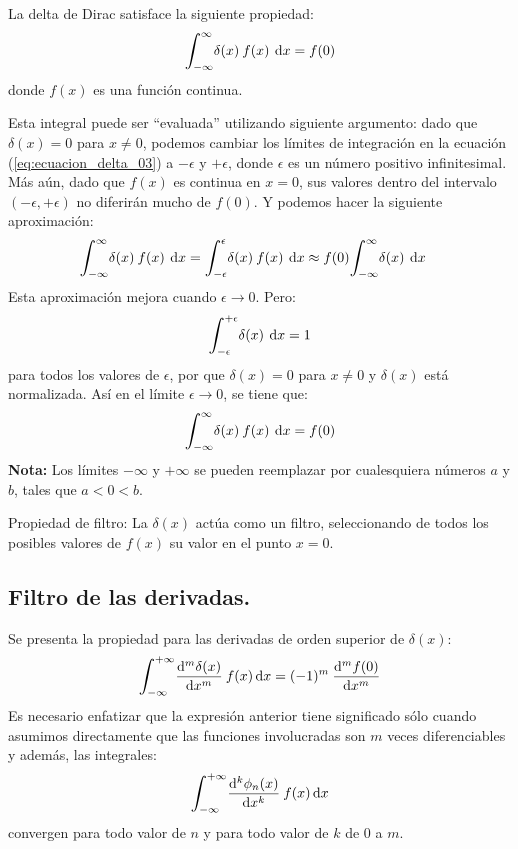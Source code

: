 \documentclass[12pt]{article}
\def\scaleint#1{\vcenter{\hbox{\scaleto[3ex]{\displaystyle\int}{#1}}}}
\def\bs{\mkern-12mu}
\numberwithin{equation}{section}
\begin{document}
La delta de Dirac satisface la siguiente propiedad:
\begin{equation}
\scaleint{6ex}_{\bs -\infty}^{\infty} \delta (x) \: f (x) \: \dd{x} = f (0)
\label{eq:ecuacion_delta_03}
\end{equation}
donde $f(x)$ es una función continua.
\par
Esta integral puede ser \enquote{evaluada} utilizando siguiente argumento:  dado que $\delta (x) = 0$
para $x \neq 0$, podemos cambiar los límites de integración en la ecuación (\ref{eq:ecuacion_delta_03}) a $- \epsilon$ y $+ \epsilon$, donde $\epsilon$ es un número positivo infinitesimal. Más aún, dado que $f (x)$ es continua en $x = 0$, sus valores dentro del intervalo $( - \epsilon, + \epsilon)$ no diferirán mucho de $f(0)$. Y podemos hacer la siguiente aproximación:
\begin{align*}
&\scaleint{6ex}_{\bs -\infty}^{\infty} \delta (x) \: f (x) \: \dd{x} = \scaleint{6ex}_{\bs -\epsilon}^{\epsilon} \delta (x) \: f (x) \: \dd{x} \approx f(0) \scaleint{6ex}_{\bs -\infty}^{\infty} \delta (x) \: \dd{x}
\end{align*}
Esta aproximación mejora cuando $\epsilon \to 0$. Pero:
\begin{align*}
\scaleint{6ex}_{\bs -\epsilon}^{+\epsilon} \delta (x) \: \dd{x} = 1
\end{align*}
para todos los valores de $\epsilon$, por que $\delta (x) = 0$ para $x \neq 0$ y $\delta (x)$ está normalizada. Así en el límite $\epsilon \to 0$, se tiene que:
\begin{align*}
\scaleint{6ex}_{\bs -\infty}^{\infty} \delta (x) \: f (x) \: \dd{x} = f(0)
\end{align*}
\textbf{Nota: } Los límites $-\infty$ y $+\infty$ se pueden reemplazar por cualesquiera números $a$ y $b$, tales que $a < 0 < b$.
\par
Propiedad de filtro: La $\delta (x)$ actúa como un filtro, seleccionando de todos los posibles valores de $f (x)$ su valor en el punto $x = 0$.

\subsection{Filtro de las derivadas.}

Se presenta la propiedad para las derivadas de orden superior de $\delta (x)$:
\begin{align*}
\scaleint{6ex}_{\bs -\infty}^{+\infty} \dv[m]{\delta (x)}{x} \: f (x) \dd{x} =  (-1)^{m} \: \dv[m]{f (0)}{x}
\end{align*}
Es necesario enfatizar que la expresión anterior tiene significado sólo cuando asumimos directamente que las funciones involucradas son $m$ veces diferenciables y además, las integrales:
\begin{align*}
\scaleint{6ex}_{\bs -\infty}^{+\infty} \dv[k]{\phi_{n}(x)}{x} \: f (x) \dd{x}
\end{align*}
convergen para todo valor de $n$ y para todo valor de $k$ de $0$ a $m$.
\end{document}

